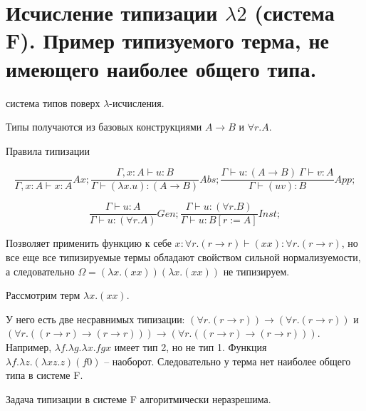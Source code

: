 \section{Исчисление типизации \texorpdfstring{$\lambda 2$}{} (система F). Пример типизуемого терма, не имеющего наиболее общего типа.}

\begin{definition}[Система F]
система типов поверх $\lambda$-исчисления.

Типы получаются из базовых конструкциями $A \to B$ и $\forall r.A$.
\end{definition}

Правила типизации

\[
\frac{}{\Gamma, x:A \vdash x:A} Ax;
\frac{\Gamma, x:A \vdash u:B}{\Gamma \vdash (\lambda x.u) : (A \to B)} Abs;
\frac{\Gamma \vdash u : (A \to B)~\Gamma \vdash v : A}{\Gamma \vdash (uv):B} App;
\]

\[
\frac{\Gamma \vdash u : A}{\Gamma \vdash u : (\forall r.A)} Gen;
\frac{\Gamma \vdash u : (\forall r.B)}{\Gamma \vdash u : B[r := A]} Inst;
\]

\begin{important}
Позволяет применить функцию к себе \(x : \forall r.(r \to r) \vdash (xx) : \forall r.(r \to r) \), но все еще все типизируемые термы обладают свойством сильной нормализуемости, а следовательно $\Omega = (\lambda x. (xx))(\lambda x. (xx))$ не типизируем.
\end{important}

\begin{example}
Рассмотрим терм $\lambda x. (xx)$.

У него есть две несравнимых типизации:
$(\forall r. (r \to r)) \to (\forall r. (r \to r))$ и $(\forall r. ((r \to r) \to (r \to r))) \to (\forall r. ((r \to r) \to (r \to r)))$.
Например, $\lambda f . \lambda g . \lambda x . f g x$ имеет тип 2, но не тип 1.
Функция $\lambda f. \lambda z . (\lambda x z. z) (f 0)$ --  наоборот.
Следовательно у терма нет наиболее общего типа в системе F.


\end{example}


Задача типизации в системе F алгоритмически неразрешима.
